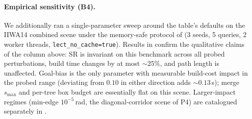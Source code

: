 \documentclass[journal]{IEEEtran}
\begin{document}
\paragraph{Empirical sensitivity (B4).}
We additionally ran a single-parameter sweep around the table’s
defaults on the IIWA14 combined scene under the memory-safe protocol
of  (3 seeds, 5 queries, 2 worker threads,
\texttt{lect\_no\_cache=true}). Results in 
confirm the qualitative claims of the column above: SR is invariant on
this benchmark across all probed perturbations, build time changes by
at most $\sim 25\%$, and path length is unaffected. Goal-bias is the
only parameter with measurable build-cost impact in the probed range
(deviating from $0.10$ in either direction adds $\sim 0.13$\,s); merge
$s_{\max}$ and per-tree box budget are essentially flat on this scene.
Larger-impact regimes (min-edge $10^{-5}$\,rad, the diagonal-corridor
scene of P4) are catalogued separately in .


\end{document}
